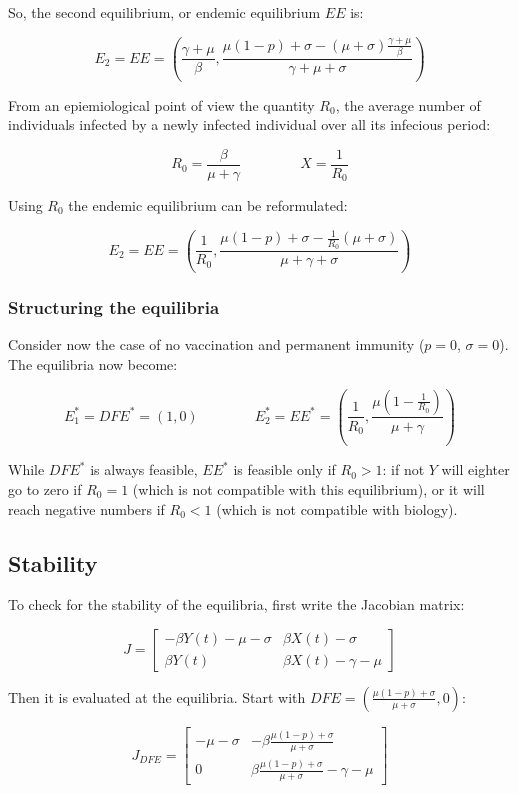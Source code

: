   So, the second equilibrium, or endemic equilibrium $EE$ is:

  $$E_2 = EE = \left(\frac{\gamma + \mu}{\beta},\frac{ \mu (1-p) + \sigma- (\mu+\sigma)\frac{\gamma+\mu}{\beta}}{\gamma+\mu +\sigma}\right)$$

  From an epiemiological point of view the quantity $R_0$, the average number of individuals infected by a newly infected individual over all its infecious period:

  $$R_0 = \frac{\beta}{\mu+\gamma}\qquad\qquad\ X = \frac{1}{R_0}$$

  Using $R_0$ the endemic equilibrium can be reformulated:

  $$E_2 = EE = \left(\frac{1}{R_0}, \frac{\mu(1-p)+\sigma-\frac{1}{R_0}(\mu+\sigma)}{\mu+\gamma+\sigma}\right)$$

    \subsubsection{Structuring the equilibria}
    Consider now the case of no vaccination and permanent immunity ($p = 0$, $\sigma = 0$).
    The equilibria now become:

    $$E^*_1 = DFE^* = \left(1,0\right)\qquad\qquad E^*_2 = EE^* = \left(\frac{1}{R_0}, \frac{\mu\left(1-\frac{1}{R_0}\right)}{\mu+\gamma}\right)$$

    While $DFE^*$ is always feasible, $EE^*$ is feasible only if $R_0 > 1$: if not $Y$ will eighter go to zero if $R_0=1$ (which is not compatible with this equilibrium), or it will reach negative numbers if $R_0<1$ (which is not compatible with biology).

  \subsection{Stability}
  To check for the stability of the equilibria, first write the Jacobian matrix:

  $$J = \begin{bmatrix}-\beta Y(t) -\mu -\sigma & \beta X(t) -\sigma\\ \beta Y(t) & \beta X(t) - \gamma - \mu\end{bmatrix}$$

  Then it is evaluated at the equilibria.
  Start with $DFE = \left(\frac{\mu(1-p)+\sigma}{\mu+\sigma},0\right)$:

  $$J_{DFE} = \begin{bmatrix}-\mu -\sigma & -\beta\frac{\mu(1-p)+\sigma}{\mu+\sigma}\\ 0 & \beta\frac{\mu(1-p)+\sigma}{\mu+\sigma}-\gamma-\mu\end{bmatrix}$$

